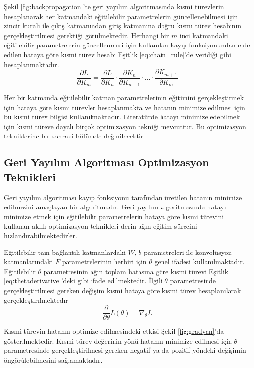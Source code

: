 Şekil \ref{fig:backpropagation}'te geri yayılım algoritmasında kısmi türevlerin hesaplanarak her katmandaki eğitilebilir parametrelerin güncellenebilmesi için zincir kuralı ile çıkış katmanından giriş katmanına doğru kısmı türev hesabının gerçekleştirilmesi gerektiği görülmektedir. Herhangi bir $m$ inci katmandaki eğitilebilir parametrelerin güncellenmesi için kullanılan kayıp fonksiyonundan elde edilen hataya göre kısmi türev hesabı Eşitlik \ref{eq:chain_rule}'de veridiği gibi hesaplanmaktadır.
\begin{equation}
	\label{eq:chain_rule}
	\frac{\partial L}{\partial  K_{m}} = \frac{\partial L}{\partial  K_{n}}\cdot\frac{\partial K_{n}}{\partial  K_{n-1}}\cdot...\cdot \frac{\partial K_{m+1}}{\partial  K_{m}}
\end{equation}

Her bir katmanda eğitilebilir katman parametrelerinin eğitimini gerçekleştirmek için hataya göre kısmi türevler hesaplanmakta ve hatanın minimize edilmesi için bu kısmi türev bilgisi kullanılmaktadır. Literatürde hatayı minimize edebilmek için kısmi türeve dayalı birçok optimizasyon tekniği mevcuttur. Bu optimizasyon tekniklerine bir sonraki bölümde değinilecektir.

\subsection{Geri Yayılım Algoritması Optimizasyon Teknikleri}
Geri yayılım algoritması kayıp fonksiyonu tarafından üretilen hatanın minimize edilmesini amaçlayan bir algoritmadır. Geri yayılım algoritmasında hatayı minimize etmek için eğitilebilir parametrelerin hataya göre kısmi türevini kullanan akıllı optimizasyon teknikleri derin ağın eğitim sürecini hızlandırabilmektedirler. 

Eğitilebilir tam bağlantılı katmanlardaki $W$, $b$ parametreleri ile konvolüsyon katmanlarındaki $F$ parametrelerinin herbiri için $\theta$ genel ifadesi kullanılmaktadır. Eğitilebilir $\theta$ parametresinin ağın toplam hatasına göre kısmi türevi Eşitlik \ref{eq:thetaderivative}'deki gibi ifade edilmektedir. İlgili $\theta$ parametresinde gerçekleştirilmesi gereken değişim kısmi hataya göre kısmi türev hesaplanılarak gerçekleştirilmektedir.
\begin{equation}
	\label{eq:thetaderivative}
	\frac{\partial}{\partial  \theta}L(\theta) = \nabla_{\theta}L
\end{equation} 

Kısmi türevin hatanın optimize edilmesindeki etkisi Şekil \ref{fig:gradyan}'da gösterilmektedir. Kısmi türev değerinin yönü hatanın minimize edilmesi için $\theta$ parametresinde gerçekleştirilmesi gereken negatif ya da pozitif yöndeki değişimin öngörülebilmesini sağlamaktadır.

